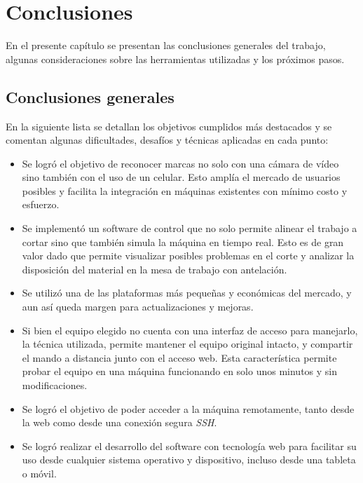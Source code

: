 \chapter{Conclusiones}
\label{Chapter5}
En el presente capítulo se presentan las conclusiones generales del trabajo, algunas consideraciones sobre las herramientas utilizadas y los próximos pasos.

\section{Conclusiones generales }

En la siguiente lista se detallan los objetivos cumplidos más destacados y se comentan algunas dificultades, desafíos y técnicas aplicadas en cada punto:

\begin{itemize}
   \item{Se logró el objetivo de reconocer marcas no solo con una cámara de vídeo sino también con el uso de un celular. Esto amplía el mercado de usuarios posibles y facilita la integración en máquinas existentes con mínimo costo y esfuerzo.}

   \item{Se implementó un software de control que no solo permite alinear el trabajo a cortar sino que también simula la máquina en tiempo real. Esto es de gran valor dado que permite visualizar posibles problemas en el corte y analizar la disposición del material en la mesa de trabajo con antelación.}

   \item{Se utilizó una de las plataformas más pequeñas y económicas del mercado, y aun así queda margen para actualizaciones y mejoras.}

   \item{Si bien el equipo elegido no cuenta con una interfaz de acceso para manejarlo, la técnica utilizada, permite mantener el equipo original intacto, y compartir el mando a distancia junto con el acceso web. Esta característica permite probar el equipo en una máquina funcionando en solo unos minutos y sin modificaciones.}

   \item{Se logró el objetivo de poder acceder a la máquina remotamente, tanto desde la web como desde una conexión segura \textit{SSH}.}

   \item{Se logró realizar el desarrollo del software con tecnología web para facilitar su uso desde cualquier sistema operativo y dispositivo, incluso desde una tableta o móvil.}


\end{itemize}
